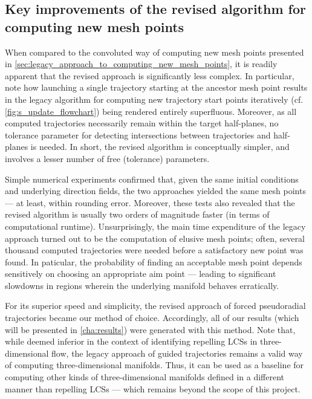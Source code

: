 \subsection{Key improvements of the revised algorithm for computing new mesh
points}
\label{sub:key_improvements_of_the_revised_algorithm_for_computing_new_mesh%
_points}

When compared to the convoluted way of computing new mesh points presented in
\cref{sec:legacy_approach_to_computing_new_mesh_points}, it is readily apparent
that the revised approach is significantly less complex. In particular, note
how launching a single trajectory starting at the ancestor mesh point results
in the legacy algorithm for computing new trajectory start points iteratively
(cf. \cref{fig:s_update_flowchart}) being rendered entirely superfluous.
Moreover, as all computed trajectories necessarily remain within the target
half-planes, no tolerance parameter for detecting intersections between
trajectories and half-planes is needed. In short, the revised algorithm is
conceptually simpler, and involves a lesser number of free (tolerance)
parameters.

Simple numerical experiments confirmed that, given the same initial
conditions and underlying direction fields, the two approaches yielded the
same mesh points --- at least, within rounding error. Moreover, these tests
also revealed that the revised algorithm is usually two orders of
magnitude faster (in terms of computational runtime). Unsurprisingly, the
main time expenditure of the legacy approach turned out to be the computation
of elusive mesh points; often, several thousand computed trajectories were
needed before a satisfactory new point was found. In paticular, the probability
of finding an acceptable mesh point depends sensitively on choosing an
appropriate aim point --- leading to significant slowdowns in regions wherein
the underlying manifold behaves erratically.

For its superior speed and simplicity, the revised approach of forced
pseudoradial trajectories became our method of choice. Accordingly, all
of our results (which will be presented in \cref{cha:results}) were generated
with this method. Note that, while deemed inferior in the context of
identifying repelling LCSs in three-dimensional flow, the legacy approach of
guided trajectories remains a valid way of computing three-dimensional
manifolds. Thus, it can be used as a baseline for computing other kinds of
three-dimensional manifolds defined in a different manner than repelling LCSs
--- which remains beyond the scope of this project.
